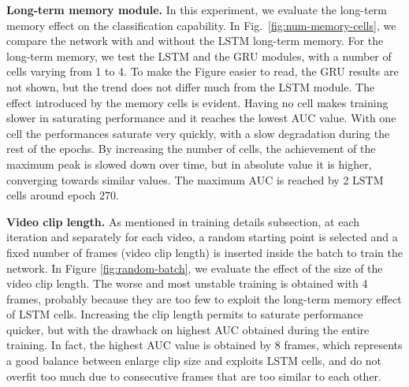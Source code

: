 
\noindent\textbf{Long-term memory module.}
In this experiment, we evaluate the long-term memory effect on the classification capability.
In Fig.~\ref{fig:num-memory-cells}, we compare the network with and without the LSTM long-term memory.
For the long-term memory, we test the LSTM and the GRU \cite{chung2014empirical} modules, with a number of cells varying from 1 to 4.
To make the Figure easier to read, the GRU results are not shown, but the trend does not differ much from the LSTM module. 
The effect introduced by the memory cells is evident.
Having no cell makes training slower in saturating performance and it reaches the lowest AUC value.
With one cell the performances saturate very quickly, with a slow degradation during the rest of the epochs.
By increasing the number of cells, the achievement of the maximum peak is slowed down over time, but in absolute value it is higher, converging towards similar values.
The maximum AUC is reached by 2 LSTM cells around epoch 270.


\noindent\textbf{Video clip length.}
As mentioned in training details subsection, at each iteration and separately for each video, a random starting point is selected and a fixed number of frames (video clip length) is inserted inside the batch to train the network.
In Figure \ref{fig:random-batch}, we evaluate the effect of the size of the video clip length.
The worse and most unstable training is obtained with 4 frames, probably because they are too few to exploit the long-term memory effect of LSTM cells.
Increasing the clip length permits to saturate performance quicker, but with the drawback on highest AUC obtained during the entire training.
In fact, the highest AUC value is obtained by 8 frames, which represents a good balance between enlarge clip size and exploits LSTM cells, and do not overfit too much due to consecutive frames that are too similar to each other.

